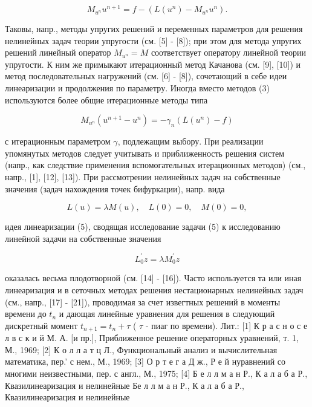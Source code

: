 \documentclass[10pt]{article}
\begin{document}
\[

M_{u^{n}} u^{n+1}=f-\left(L\left(u^{n}\right)-M_{u^{n}} u^{n}\right) .

\]



Таковы, напр., методы упругих решений и переменных параметров для решения нелинейных задач теории упругости (см. [5] - [8]); при этом для метода упругих решений линейный оператор $M_{u^{n}}=M$ соответствует оператору линейной теории упругости. К ним же примыкают итерационный метод Качанова (см. [9], [10]) и метод последовательных нагружений (см. [6] - [8]), сочетающий в себе идеи линеаризации и продолжения по параметру. Иногда вместо методов (3) используются более общие итерационные методы типа



\[

M_{u^{n}}\left(u^{n+1}-u^{n}\right)=-\gamma_{n}\left(L\left(u^{n}\right)-f\right)

\]



с итерационным параметром $\gamma$, подлежащим выбору. При реализации упомянутых методов следует учитывать и приближенность решения систем (напр., как следствие применения вспомогательных итерационных методов) (см., напр., [1], [12], [13]). При рассмотрении нелинейных задач на сөбственные значения (задач нахождения точек бифуркации), напр. вида



\[

L(u)=\lambda M(u), \quad L(0)=0, \quad M(0)=0,

\]



идея линеаризации (5), сводящая исследование задачи (5) к исследованию линейной задачи на собственные значения



\[

L_{0}^{\prime} z=\lambda M_{0}^{\prime} z

\]



оказалась весьма плодотворной (см. [14] - [16]). Часто используется та или иная линеаризация и в сеточных методах решения нестационарных нелинейных задач (см., напр., [17] - [21]), проводимая за счет извегтных решений в моменты времени до $t_{n}$ и дающая линейные уравнения для решения в следующий дискретный момент $t_{n+1}=t_{n}+\tau$ ( $\tau$ - пиаг по времени). Лит.: [1] К р а с н о с е л в с к и й М. А. [и пр.], Приближенное решение операторных уравнений, т. 1, М., 1969; [2] К о л л а т ц Л., Функциональный анализ и вычислительная математика, пер.' с нем., М., 1969; [3] О р т е г а Д ж., Р е й нуравнений со многими неизвестными, пер. с англ., М., 1975; [4] Б е л л м а н Р., К а л а б а Р., Квазилинеаризация и нелинейные Бе л л м а н Р., К а л а б а Р., Квазилинеаризация и нелинейные
\end{document}
